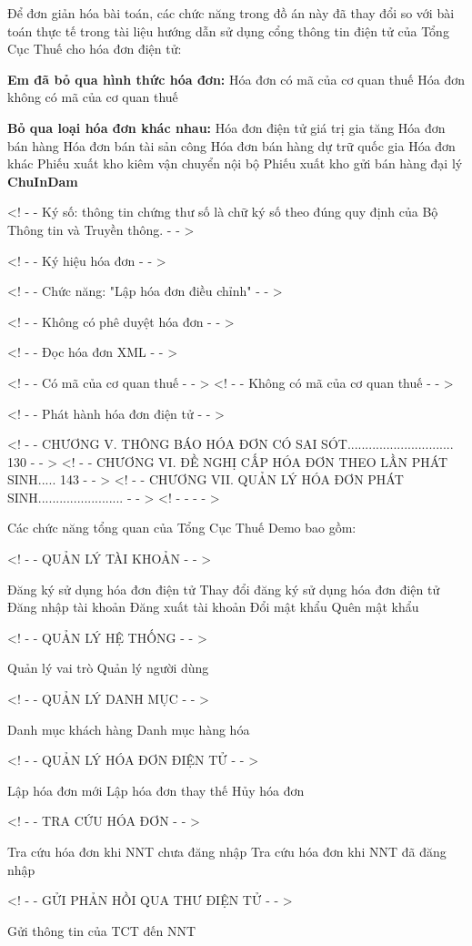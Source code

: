 Để đơn giản hóa bài toán, các chức năng trong đồ án này đã thay đổi so với bài toán thực tế trong tài liệu hướng dẫn sử dụng cổng thông tin điện tử của Tổng Cục Thuế cho hóa đơn điện tử:

\textbf{Em đã bỏ qua hình thức hóa đơn:}
Hóa đơn có mã của cơ quan thuế
Hóa đơn không có mã của cơ quan thuế

\textbf{Bỏ qua loại hóa đơn khác nhau:}
Hóa đơn điện tử giá trị gia tăng
Hóa đơn bán hàng
Hóa đơn bán tài sản công
Hóa đơn bán hàng dự trữ quốc gia
Hóa đơn khác
Phiếu xuất kho kiêm vận chuyển nội bộ
Phiếu xuất kho gửi bán hàng đại lý
\textbf{ChuInDam}

<! - - Ký số: thông tin chứng thư số là chữ ký số theo đúng quy định của Bộ Thông tin và Truyền thông. - - >

<! - - Ký hiệu hóa đơn - - >

<! - - Chức năng: "Lập hóa đơn điều chỉnh" - - >

<! - - Không có phê duyệt hóa đơn - - >

<! - - Đọc hóa đơn XML - - >

<! - - Có mã của cơ quan thuế - - >
<! - - Không có mã của cơ quan thuế - - >

<! - - Phát hành hóa đơn điện tử - - >

<! - - CHƯƠNG V. THÔNG BÁO HÓA ĐƠN CÓ SAI SÓT.............................. 130 - - >
<! - - CHƯƠNG VI. ĐỀ NGHỊ CẤP HÓA ĐƠN THEO LẦN PHÁT SINH..... 143 - - >
<! - - CHƯƠNG VII. QUẢN LÝ HÓA ĐƠN PHÁT SINH........................ - - >
<! - - - - >

Các chức năng tổng quan của Tổng Cục Thuế Demo bao gồm:

<! - - QUẢN LÝ TÀI KHOẢN - - >

Đăng ký sử dụng hóa đơn điện tử
Thay đổi đăng ký sử dụng hóa đơn điện tử
Đăng nhập tài khoản
Đăng xuất tài khoản
Đổi mật khẩu
Quên mật khẩu

<! - - QUẢN LÝ HỆ THỐNG - - >

Quản lý vai trò
Quản lý người dùng

<! - - QUẢN LÝ DANH MỤC - - >

Danh mục khách hàng
Danh mục hàng hóa

<! - - QUẢN LÝ HÓA ĐƠN ĐIỆN TỬ - - >

Lập hóa đơn mới
Lập hóa đơn thay thế
Hủy hóa đơn

<! - - TRA CỨU HÓA ĐƠN - - >

Tra cứu hóa đơn khi NNT chưa đăng nhập
Tra cứu hóa đơn khi NNT đã đăng nhập

<! - - GỬI PHẢN HỒI QUA THƯ ĐIỆN TỬ - - >

Gửi thông tin của TCT đến NNT